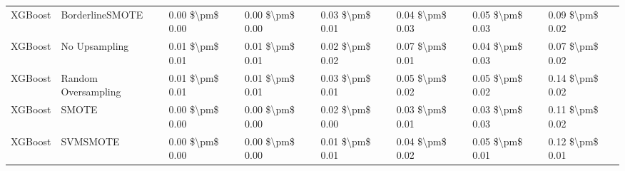 \begin{tabular}{llllllll}
                        XGBoost &               BorderlineSMOTE & 0.00 \$\textbackslash pm\$ 0.00 &           0.00 \$\textbackslash pm\$ 0.00 &       0.03 \$\textbackslash pm\$ 0.01 &        0.04 \$\textbackslash pm\$ 0.03 &                         0.05 \$\textbackslash pm\$ 0.03 &     0.09 \$\textbackslash pm\$ 0.02 \\
                        XGBoost &                 No Upsampling & 0.01 \$\textbackslash pm\$ 0.01 &           0.01 \$\textbackslash pm\$ 0.01 &       0.02 \$\textbackslash pm\$ 0.02 &        0.07 \$\textbackslash pm\$ 0.01 &                         0.04 \$\textbackslash pm\$ 0.03 &     0.07 \$\textbackslash pm\$ 0.02 \\
                        XGBoost &           Random Oversampling & 0.01 \$\textbackslash pm\$ 0.01 &           0.01 \$\textbackslash pm\$ 0.01 &       0.03 \$\textbackslash pm\$ 0.01 &        0.05 \$\textbackslash pm\$ 0.02 &                         0.05 \$\textbackslash pm\$ 0.02 &     0.14 \$\textbackslash pm\$ 0.02 \\
                        XGBoost &                         SMOTE & 0.00 \$\textbackslash pm\$ 0.00 &           0.00 \$\textbackslash pm\$ 0.00 &       0.02 \$\textbackslash pm\$ 0.00 &        0.03 \$\textbackslash pm\$ 0.01 &                         0.03 \$\textbackslash pm\$ 0.03 &     0.11 \$\textbackslash pm\$ 0.02 \\
                        XGBoost &                      SVMSMOTE & 0.00 \$\textbackslash pm\$ 0.00 &           0.00 \$\textbackslash pm\$ 0.00 &       0.01 \$\textbackslash pm\$ 0.01 &        0.04 \$\textbackslash pm\$ 0.02 &                         0.05 \$\textbackslash pm\$ 0.01 &     0.12 \$\textbackslash pm\$ 0.01 \\
\bottomrule
\end{tabular}
